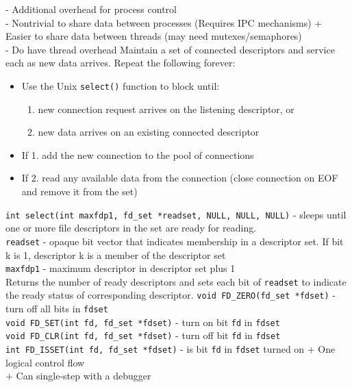 \documentclass[number]{notes}
\begin{document}
\begin{landscape}
\begin{multicols}{3}
- Additional overhead for process control\\
- Nontrivial to share data between processes (Requires IPC mechanisms)
+ Easier to share data between threads (may need mutexes/semaphores)\\
- Do have thread overhead
Maintain a set of connected descriptors and service each as new data arrives. Repeat the following forever:
\begin{itemize}[nolistsep]
    \item Use the Unix \texttt{select()} function to block until:
    \begin{enumerate}[nolistsep]
        \item new connection request arrives on the listening descriptor, or
        \item new data arrives on an existing connected descriptor
    \end{enumerate}
    \item If 1. add the new connection to the pool of connections
    \item If 2. read any available data from the connection (close connection on EOF and remove it from the set)
\end{itemize}
\texttt{int select(int maxfdp1, fd\_set *readset, NULL, NULL, NULL)} - sleeps until one or more file descriptors in the set are ready for reading.\\
\texttt{readset} - opaque bit vector that indicates membership in a descriptor set. If bit k is 1, descriptor k is a member of the descriptor set\\
\texttt{maxfdp1} - maximum descriptor in descriptor set plus 1\\
Returns the number of ready descriptors and sets each bit of \texttt{readset} to indicate the ready status of corresponding descriptor.
\texttt{void FD\_ZERO(fd\_set *fdset)} - turn off all bits in \texttt{fdset}\\
\texttt{void FD\_SET(int fd, fd\_set *fdset)} - turn on bit \texttt{fd} in \texttt{fdset}\\
\texttt{void FD\_CLR(int fd, fd\_set *fdset)} - turn off bit \texttt{fd} in \texttt{fdset}\\
\texttt{int FD\_ISSET(int fd, fd\_set *fdset)} - is bit \texttt{fd} in \texttt{fdset} turned on
+ One logical control flow\\
+ Can single-step with a debugger\\

\end{multicols}
\end{landscape}
\end{document}
